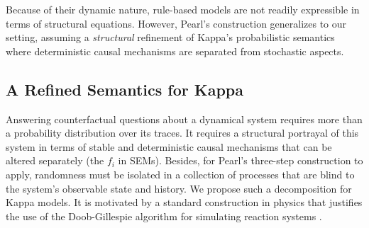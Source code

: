 Because of their dynamic nature, rule-based models are not readily
expressible in terms of structural equations. However, Pearl's
construction generalizes to our setting, assuming a \emph{structural}
refinement of Kappa's probabilistic semantics where deterministic
causal mechanisms are separated from stochastic aspects.

\iffalse provided that we separate the deterministic causal mechanisms
of a model from its stochastic aspects. This means reinterpreting a
temporal trace as a deterministic function of a separately specifiable
series of mutually independent stochastic choices, allowing us to
reuse the randomness inherent to a specific actual trace in the
construction of counterfactual versions induced by intervention.  \fi

\iffalse Because of their dynamic nature, rule-based
models do not have structural equations that are readily available at
the outset. However, Pearl's construction generalizes to our setting,
provided that we separate the randomness of simulation from its
deterministic causal mechanisms. \fi

\subsection{A Refined Semantics for Kappa}
\label{subsec:semantics-refinement}

Answering counterfactual questions about a dynamical system requires
more than a probability distribution over its traces. It requires a
structural portrayal of this system in terms of stable and
deterministic causal mechanisms that can be altered separately (the
$f_i$ in SEMs). Besides, for Pearl's three-step construction to
apply, randomness must be isolated in a collection of processes that
are blind to the system's observable state and history. We propose
such a decomposition for Kappa models. It is motivated by a standard
construction in physics that justifies the use of the Doob-Gillespie
algorithm for simulating reaction systems \cite{gillespie1977exact}.


